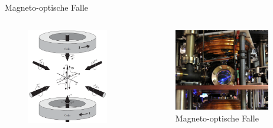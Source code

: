 \documentclass[12pt,xcolor=dvipsnames]{beamer}
\begin{document}
\begin{frame}{Magneto-optische Falle}
\begin{columns}
	\begin{figure}
		\centering
		\includegraphics[width=0.9\textwidth]{./figures/mot_3d.png}
		\caption{\cite{foot}}
	\end{figure}

	\begin{figure}
		\centering
		\includegraphics[width=0.9\textwidth]{./figures/mot_columbia.jpg}
		\caption{Magneto-optische Falle \cite{columbia}}
	\end{figure}
\end{columns}
\end{frame}
\end{document}
